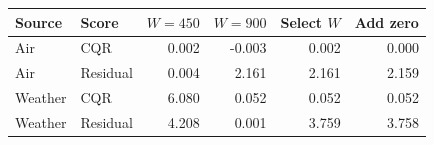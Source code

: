 \begin{tabular}{llrrrr}
\toprule
Source & Score & $W=450$ & $W=900$ & Select $W$ & Add zero \\
\midrule
Air & CQR & 0.002 & -0.003 & 0.002 & 0.000 \\
Air & Residual & 0.004 & 2.161 & 2.161 & 2.159 \\
Weather & CQR & 6.080 & 0.052 & 0.052 & 0.052 \\
Weather & Residual & 4.208 & 0.001 & 3.759 & 3.758 \\
\bottomrule
\end{tabular}
